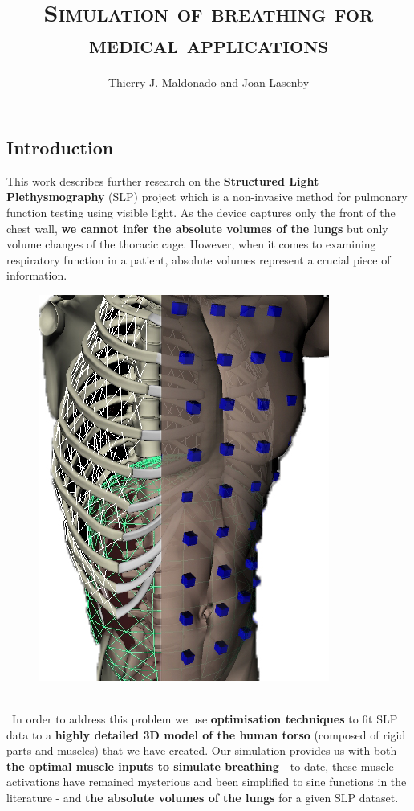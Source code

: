 \documentclass[boxedsections ,landscape, a0]{sciposter_v2}
\title{\textsc{Simulation of breathing for medical applications}}
\author{Thierry J. Maldonado and Joan Lasenby}
\institute{Signal Processing and Communications Laboratory, Department of Engineering, University of Cambridge}
\begin{document}
\maketitle
\begin{multicols}{4}

\section*{Introduction}


This work describes further research on the \textbf{Structured Light Plethysmography} (SLP) \cite{2010slp} project which is a non-invasive method for pulmonary function testing using visible light. As the device captures only the front
of the chest wall, \textbf{we cannot infer the absolute volumes of the lungs}
but only volume changes of the thoracic cage. However, when it
comes to examining respiratory function in a patient, absolute volumes
represent a crucial piece of information. 

\begin{figure}

  \begin{center}
  
    \includegraphics[width=0.4\columnwidth]{imgs/model}
     
  \end{center}
\vspace{-\bigskipamount}     

\end{figure}

\
\\
\
In order to address
this problem we use \textbf{optimisation techniques} to fit SLP data to a
\textbf{highly detailed 3D model of the human torso} (composed of rigid
parts and muscles) that we have created. Our simulation provides
us with both \textbf{the optimal muscle inputs to simulate breathing} - to
date, these muscle activations have remained mysterious and been
simplified to sine functions in the literature - and \textbf{the absolute volumes
of the lungs} for a given SLP dataset.


\end{multicols}
\end{document}

